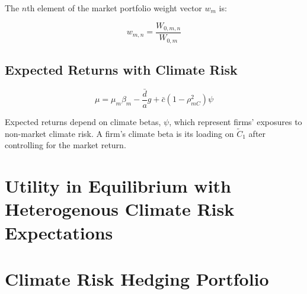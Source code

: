 The $n$th element of the market portfolio weight vector $w_m$ is:

\begin{equation}
    w_{m,n} = \frac{W_{0,m,n}}{W_{0,m}}
\end{equation}



\subsection{Expected Returns with Climate Risk}

\begin{equation}
    \mu = \mu_m \beta_m - \frac{\bar{d}}{a}g + \bar{c}(1 - \rho^2_{mC}) \psi 
\end{equation}

Expected returns depend on climate betas, $\psi$, which represent 
firms' exposures to non-market climate risk. A firm's climate 
beta is its loading on $\tilde{C}_1$ after controlling for the market return. 


\section{Utility in Equilibrium with Heterogenous 
Climate Risk Expectations}

\section{Climate Risk Hedging Portfolio}
